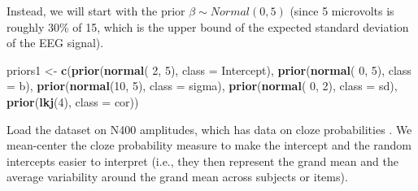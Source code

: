 \documentclass[12pt,]{krantz}
\newenvironment{Shaded}{\begin{snugshade}}{\end{snugshade}}
\newcommand{\DataTypeTok}[1]{\textcolor[rgb]{0.13,0.29,0.53}{#1}}
\newcommand{\DecValTok}[1]{\textcolor[rgb]{0.00,0.00,0.81}{#1}}
\newcommand{\KeywordTok}[1]{\textcolor[rgb]{0.13,0.29,0.53}{\textbf{#1}}}
\newcommand{\NormalTok}[1]{#1}
\newcommand{\OperatorTok}[1]{\textcolor[rgb]{0.81,0.36,0.00}{\textbf{#1}}}
\newcommand{\StringTok}[1]{\textcolor[rgb]{0.31,0.60,0.02}{#1}}
\theoremstyle{definition}
\theoremstyle{definition}
\theoremstyle{definition}
\theoremstyle{remark}
\begin{document}
Instead, we will start with the prior \(\beta \sim Normal(0,5)\) (since 5 microvolts is roughly 30\% of 15, which is the upper bound of the expected standard deviation of the EEG signal).

\begin{Shaded}
\begin{Highlighting}[]
\NormalTok{priors1 <-}\StringTok{ }\KeywordTok{c}\NormalTok{(}\KeywordTok{prior}\NormalTok{(}\KeywordTok{normal}\NormalTok{( }\DecValTok{2}\NormalTok{, }\DecValTok{5}\NormalTok{), }\DataTypeTok{class =}\NormalTok{ Intercept),}
             \KeywordTok{prior}\NormalTok{(}\KeywordTok{normal}\NormalTok{( }\DecValTok{0}\NormalTok{, }\DecValTok{5}\NormalTok{), }\DataTypeTok{class =}\NormalTok{ b),}
             \KeywordTok{prior}\NormalTok{(}\KeywordTok{normal}\NormalTok{(}\DecValTok{10}\NormalTok{, }\DecValTok{5}\NormalTok{), }\DataTypeTok{class =}\NormalTok{ sigma),}
             \KeywordTok{prior}\NormalTok{(}\KeywordTok{normal}\NormalTok{( }\DecValTok{0}\NormalTok{, }\DecValTok{2}\NormalTok{), }\DataTypeTok{class =}\NormalTok{ sd),}
             \KeywordTok{prior}\NormalTok{(}\KeywordTok{lkj}\NormalTok{(}\DecValTok{4}\NormalTok{), }\DataTypeTok{class =}\NormalTok{ cor))}
\end{Highlighting}
\end{Shaded}

Load the dataset on N400 amplitudes, which has data on cloze probabilities \citep{nieuwlandLargescaleReplicationStudy2018}. We mean-center the cloze probability measure to make the intercept and the random intercepts easier to interpret (i.e., they then represent the grand mean and the average variability around the grand mean across subjects or items).

\begin{Shaded}
\end{Shaded}
\end{document}
